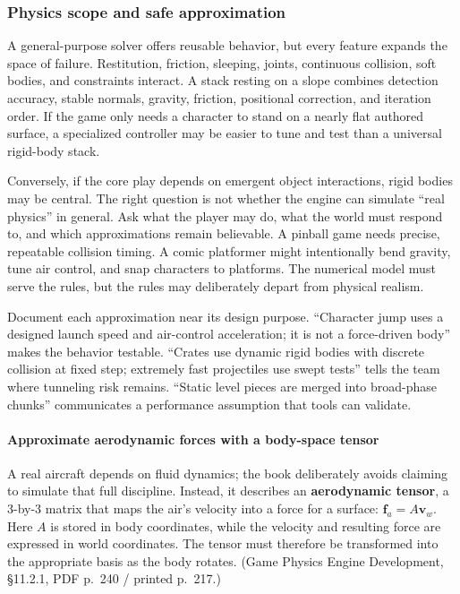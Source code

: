 \subsubsection{Physics scope and safe approximation}\label{physics-scope-and-safe-approximation}

A general-purpose solver offers reusable behavior, but every feature expands the space of failure. Restitution, friction, sleeping, joints, continuous collision, soft bodies, and constraints interact. A stack resting on a slope combines detection accuracy, stable normals, gravity, friction, positional correction, and iteration order. If the game only needs a character to stand on a nearly flat authored surface, a specialized controller may be easier to tune and test than a universal rigid-body stack.

Conversely, if the core play depends on emergent object interactions, rigid bodies may be central. The right question is not whether the engine can simulate ``real physics'' in general. Ask what the player may do, what the world must respond to, and which approximations remain believable. A pinball game needs precise, repeatable collision timing. A comic platformer might intentionally bend gravity, tune air control, and snap characters to platforms. The numerical model must serve the rules, but the rules may deliberately depart from physical realism.

Document each approximation near its design purpose. ``Character jump uses a designed launch speed and air-control acceleration; it is not a force-driven body'' makes the behavior testable. ``Crates use dynamic rigid bodies with discrete collision at fixed step; extremely fast projectiles use swept tests'' tells the team where tunneling risk remains. ``Static level pieces are merged into broad-phase chunks'' communicates a performance assumption that tools can validate.

\paragraph{Approximate aerodynamic forces with a body-space tensor}\label{approximate-aerodynamic-forces-with-a-body-space-tensor}

A real aircraft depends on fluid dynamics; the book deliberately avoids claiming to simulate that full discipline. Instead, it describes an \textbf{aerodynamic tensor}, a 3-by-3 matrix that maps the air's velocity into a force for a surface: \(\mathbf{f}_a = A\mathbf{v}_w\). Here \(A\) is stored in body coordinates, while the velocity and resulting force are expressed in world coordinates. The tensor must therefore be transformed into the appropriate basis as the body rotates. (Game Physics Engine Development, §11.2.1, PDF p.~240 / printed p.~217.)

